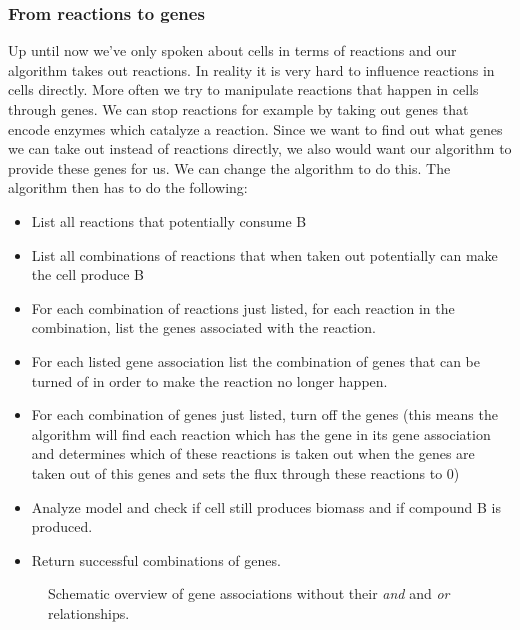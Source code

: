 \documentclass[12pt]{report}
\begin{document}
\subsubsection{From reactions to genes}
Up until now we've only spoken about cells in terms of reactions and our algorithm takes out reactions. In reality it is very hard to influence reactions in cells directly.
More often we try to manipulate reactions that happen in cells through genes.
We can stop reactions for example by taking out genes that encode enzymes which catalyze a reaction.
Since we want to find out what genes we can take out instead of reactions directly, we also would want our algorithm to provide these genes for us.
We can change the algorithm to do this.
The algorithm then has to do the following:
\begin{itemize}
\item List all reactions that potentially consume B
\item List all combinations of reactions that when taken out potentially can make the cell produce B
\item For each combination of reactions just listed, for each reaction in the combination, list the genes associated with the reaction.
\item For each listed gene association list the combination of genes that can be turned of in order to make the reaction no longer happen.
\item For each combination of genes just listed, turn off the genes (this means the algorithm will find each reaction which has the gene in its gene association and determines which of these reactions is taken out when the genes are taken out of this genes and sets the flux through these reactions to 0)
\item Analyze model and check if cell still produces biomass and if compound B is produced.
\item Return successful combinations of genes.
\end{itemize}

\begin{figure}[hbtp]
  \centering
     
      \caption{Schematic overview of gene associations without their \emph{and} and \emph{or} relationships.}
  \label{fig:genes2}
\end{figure}
\end{document}
